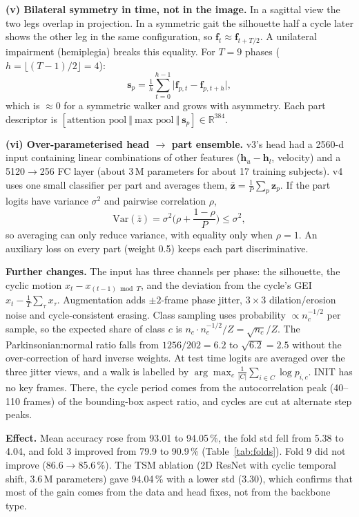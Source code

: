 \documentclass[conference]{IEEEtran}
\newcommand{\R}{\mathbb{R}}
\begin{document}
\textbf{(v) Bilateral symmetry in time, not in the image.} In a sagittal view
the two legs overlap in projection. In a symmetric gait the silhouette half a
cycle later shows the other leg in the same configuration, so
$\mathbf{f}_t\approx\mathbf{f}_{t+T/2}$. A unilateral impairment (hemiplegia)
breaks this equality. For $T=9$ phases ($h=\lfloor (T-1)/2\rfloor=4$):
\begin{equation}
\mathbf{s}_p=\tfrac{1}{h}\textstyle\sum_{t=0}^{h-1}\big|\mathbf{f}_{p,t}-\mathbf{f}_{p,t+h}\big| ,
\end{equation}
which is $\approx 0$ for a symmetric walker and grows with asymmetry. Each part
descriptor is $[\text{attention pool}\ \Vert\ \text{max pool}\ \Vert\ \mathbf{s}_p]
\in\R^{384}$.

\textbf{(vi) Over-parameterised head $\rightarrow$ part ensemble.} v3's head
had a 2560-d input containing linear combinations of other features
($\mathbf{h}_u-\mathbf{h}_l$, velocity) and a 5120$\rightarrow$256 FC layer
(about 3\,M parameters for about 17 training subjects). v4 uses one small classifier per
part and averages them, $\bar{\mathbf{z}}=\frac{1}{P}\sum_p\mathbf{z}_p$. If the
part logits have variance $\sigma^2$ and pairwise correlation $\rho$,
\begin{equation}
\mathrm{Var}(\bar{z})=\sigma^2\Big(\rho+\frac{1-\rho}{P}\Big)\le\sigma^2 ,
\end{equation}
so averaging can only reduce variance, with equality only when $\rho=1$. An
auxiliary loss on every part (weight 0.5) keeps each part discriminative.

\textbf{Further changes.} The input has three channels per phase: the
silhouette, the cyclic motion $x_t-x_{(t-1)\bmod T}$, and the deviation from
the cycle's GEI $x_t-\frac1T\sum_\tau x_\tau$. Augmentation adds $\pm2$-frame
phase jitter, $3\times3$ dilation/erosion noise and cycle-consistent erasing.
Class sampling uses probability $\propto n_c^{-1/2}$ per sample, so the expected
share of class $c$ is $n_c\cdot n_c^{-1/2}/Z=\sqrt{n_c}/Z$. The
Parkinsonian:normal ratio falls from $1256/202=6.2$ to $\sqrt{6.2}=2.5$
without the over-correction of hard inverse weights. At test time logits are
averaged over the three jitter views, and a walk is labelled by
$\arg\max_c\frac1{|C|}\sum_{i\in C}\log p_{i,c}$. INIT has no key frames.
There, the cycle period comes from the autocorrelation peak (40--110 frames) of
the bounding-box aspect ratio, and cycles are cut at alternate step peaks.

\textbf{Effect.} Mean accuracy rose from 93.01 to 94.05\,\%, the fold std
fell from 5.38 to 4.04, and fold 3 improved from 79.9 to 90.9\,\%
(Table~\ref{tab:folds}). Fold 9 did not improve (86.6$\rightarrow$85.6\,\%). The
TSM ablation (2D ResNet with cyclic temporal shift, 3.6\,M parameters) gave
94.04\,\% with a lower std (3.30), which confirms that most of the gain comes
from the data and head fixes, not from the backbone type.
\end{document}
